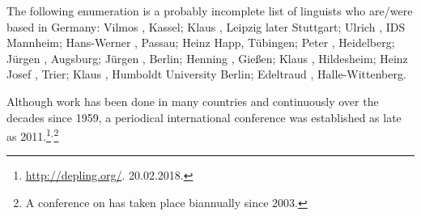 The following enumeration is a probably incomplete list of linguists who are/were based in Germany: 
Vilmos \citet{Agel2000a-u}, Kassel; 
Klaus \citet{Baumgaertner65a-u,Baumgaertner70a}, Leipzig later Stuttgart;
Ulrich \citet{Engel77,Engel2014a}, IDS Mannheim; 
Hans-Werner \citet{Eroms85a,Eroms87b-u,Eroms2000a}, Passau; 
Heinz Happ, Tübingen;
Peter \citet{Hellwig78a-u,Hellwig2003a}, Heidelberg;
Jürgen \citet{Heringer96a-u}, Augsburg; 
Jürgen \citet{Kunze68a-u,Kunze75a-u}, Berlin;
Henning \citet{Lobin93a-u}, Gießen;
Klaus \citet{Schubert87a-u}, Hildesheim;
Heinz Josef \citet{Weber97a}, Trier;
Klaus \citet{Welke88a-u,Welke2011a-u}, Humboldt University Berlin;
Edeltraud \citet{Werner93a-u}, Halle-Wittenberg.\pagebreak


Although work has been done in many countries and continuously over the decades since 1959, a
periodical international conference was established as late as 2011.\footnote{%
  \href{http://depling.org/}{http://depling.org/}. 20.02.2018.
}$^,$\footnote{%
  A conference on \mtt has taken place biannually since 2003.
}


